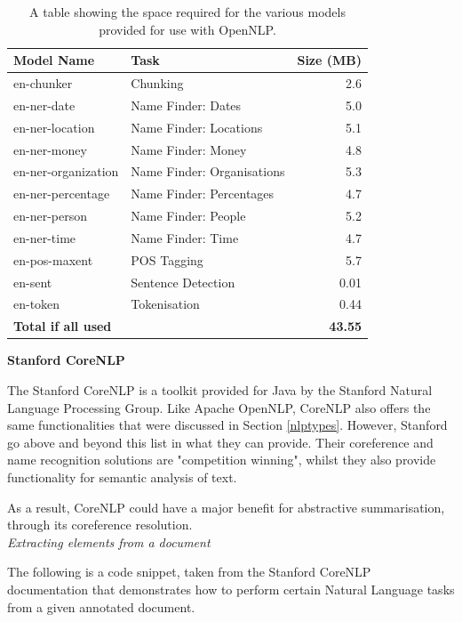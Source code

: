 \documentclass[12pt]{article}
\begin{document}
\begin{table}[H]
	\centering
	\begin{tabular}{l|l|r}
		\textbf{Model Name} & \textbf{Task} & \textbf{Size (MB)} \\ \hline
		en-chunker & Chunking & 2.6 \\ \hline
		en-ner-date & Name Finder: Dates & 5.0 \\ \hline
		en-ner-location & Name Finder: Locations & 5.1 \\ \hline
		en-ner-money & Name Finder: Money & 4.8 \\ \hline
		en-ner-organization & Name Finder: Organisations & 5.3 \\ \hline
		en-ner-percentage & Name Finder: Percentages & 4.7 \\ \hline
		en-ner-person & Name Finder: People & 5.2 \\ \hline
		en-ner-time & Name Finder: Time & 4.7 \\ \hline
		en-pos-maxent & POS Tagging & 5.7 \\ \hline
		en-sent & Sentence Detection & 0.01 \\ \hline
		en-token & Tokenisation & 0.44 \\ \hline
		\textbf{Total if all used} & & \textbf{43.55} \\ \hline
	\end{tabular}
	\caption[Space used for OpenNLP models]{A table showing the space required for the various models provided for use with OpenNLP.}
	\label{opennlpspace}
\end{table}

\textbf{Stanford CoreNLP}

The Stanford CoreNLP is a toolkit provided for Java by the Stanford Natural Language Processing Group. Like Apache OpenNLP, CoreNLP also offers the same functionalities that were discussed in Section \ref{nlptypes}. However, Stanford go above and beyond this list in what they can provide. Their coreference and name recognition solutions are "competition winning", whilst they also provide functionality for semantic analysis of text.

As a result, CoreNLP could have a major benefit for abstractive summarisation, through its coreference resolution. \\

\emph{Extracting elements from a document}

The following is a code snippet, taken from the Stanford CoreNLP documentation that demonstrates how to perform certain Natural Language tasks from a given annotated document. \\
\end{document}
